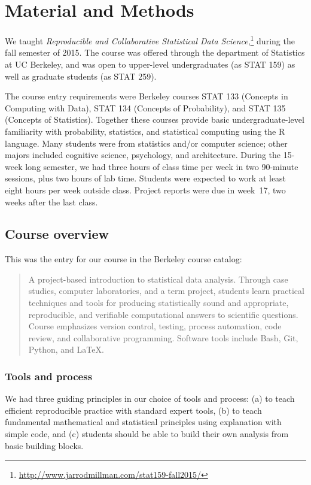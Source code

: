 \section{Material and Methods}\label{methods}

We taught \emph{Reproducible and Collaborative Statistical Data
Science},\footnote{\url{http://www.jarrodmillman.com/stat159-fall2015/}} during
the fall semester of 2015.  The course was offered through the department of
Statistics at UC Berkeley, and was open to upper-level undergraduates (as STAT
159) as well as graduate students (as STAT 259).

The course entry requirements were Berkeley courses STAT 133 (Concepts in
Computing with Data), STAT 134 (Concepts of Probability), and STAT 135
(Concepts of Statistics).  Together these courses provide basic
undergraduate-level familiarity with probability, statistics, and statistical
computing using the R language.
Many students were from statistics and/or computer science; other majors
included cognitive science, psychology, and architecture.
During the 15-week long semester, we had three hours of class time per week in
two 90-minute sessions, plus two hours of lab time.  Students were expected to
work at least eight hours per week outside class.  Project reports were due in
week~17, two weeks after the last class.

\subsection{Course overview}

This was the entry for our course in the Berkeley course catalog:

\begin{quote}
A project-based introduction to statistical data analysis. Through case
studies, computer laboratories, and a term project, students learn
practical techniques and tools for producing statistically sound and
appropriate, reproducible, and verifiable computational answers to
scientific questions. Course emphasizes version control, testing,
process automation, code review, and collaborative programming.
Software tools include Bash, Git, Python, and \LaTeX.
\end{quote}

\subsubsection{Tools and process}

We had three guiding principles in our choice of tools and process:
(a) to teach efficient reproducible practice with standard expert tools,
(b) to teach fundamental mathematical and statistical principles using
explanation with simple code, and
(c) students should be able to build their own analysis from basic building
blocks.

